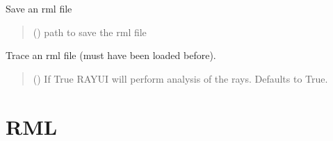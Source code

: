 \documentclass[letterpaper,10pt,english]{sphinxmanual}
\begin{document}
\begin{fulllineitems}
\begin{fulllineitems}
\label{\detokenize{API:raypyng.runner.RayUIAPI.save}}
\pysigstartsignatures
\pysiglinewithargsret
{}
{\sphinxparamcomma {}}
{}
\pysigstopsignatures
\sphinxAtStartPar
Save an rml file
\begin{quote}\begin{description}
\sphinxAtStartPar
{} () \textendash{} path to save the rml file

\end{description}\end{quote}

\end{fulllineitems}


\begin{fulllineitems}
\label{\detokenize{API:raypyng.runner.RayUIAPI.trace}}
\pysigstartsignatures
\pysiglinewithargsret
{}
{\sphinxparamcomma {}}
{}
\pysigstopsignatures
\sphinxAtStartPar
Trace an rml file (must have been loaded before).
\begin{quote}\begin{description}
\sphinxAtStartPar
{} (\sphinxstyleliteralemphasis{\sphinxupquote{, }}) \textendash{} If True RAY\sphinxhyphen{}UI will perform analysis of the rays.
Defaults to True.

\end{description}\end{quote}

\end{fulllineitems}


\end{fulllineitems}



\section{RML}
\label{\detokenize{API:rml}}
\end{document}
